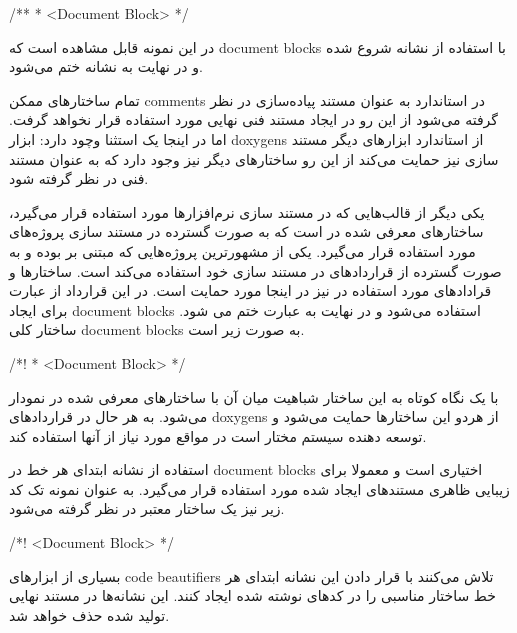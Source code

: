 \begin{C++}
/**
 * <Document Block>
 */
\end{C++}

در این نمونه قابل مشاهده است که \glspl{document block} با استفاده از نشانه
\lr{/**} شروع شده و در نهایت به نشانه \lr{*/} ختم می‌شود.

\begin{note}
تمام ساختارهای ممکن \glspl{comment} در استاندارد  به عنوان مستند
پیاده‌سازی در نظر گرفته می‌شود از این رو در ایجاد مستند فنی نهایی مورد استفاده
قرار نخواهد گرفت. اما در اینجا یک استثنا وچود دارد: ابزار \glspl{doxygen} از
استاندارد ابزارهای دیگر مستند سازی نیز حمایت می‌کند از این رو ساختارهای دیگر نیز
وجود دارد که به عنوان مستند فنی در نظر گرفته شود.
\end{note}


یکی دیگر از قالب‌هایی که در مستند سازی نرم‌افزارها مورد استفاده قرار می‌گیرد،
ساختارهای معرفی شده در  است که به صورت گسترده در مستند سازی پروژه‌های
 مورد استفاده قرار می‌گیرد. یکی از مشهورترین پروژه‌هایی که مبتنی بر
 بوده و به صورت گسترده از قراردادهای  در مستند سازی خود استفاده
می‌کند  است. ساختارها و قرادادهای مورد استفاده در  نیز در
اینجا مورد حمایت است. در این قرارداد از عبارت \lr{/*!} برای ایجاد
\glspl{document block} استفاده می‌شود و در نهایت به عبارت \lr{*/} ختم می شود.
ساختار کلی \glspl{document block} به صورت زیر است.

\begin{C++}
/*!
 * <Document Block>
 */
\end{C++}

با یک نگاه کوتاه به این ساختار شباهیت میان آ‌ن با ساختارهای
معرفی شده در  نمودار می‌شود. به هر حال در قراردادهای \glspl{doxygen}
از هردو این ساختارها حمایت می‌شود و توسعه دهنده سیستم مختار است در مواقع مورد
نیاز از آنها استفاده کند.

\begin{note}
استفاده از نشانه \lr{*} ابتدای هر خط در \glspl{document block} اختیاری است و
معمولا برای زیبایی ظاهری مستند‌های ایجاد شده مورد استفاده قرار می‌گیرد. به عنوان
نمونه تک کد زیر نیز یک ساختار معتبر در نظر گرفته می‌شود.

\begin{C++}
/*!
   <Document Block>
 */
\end{C++}

بسیاری از ابزارهای \glspl{code beautifier} تلاش می‌کنند با قرار دادن این نشانه
ابتدای هر خط ساختار مناسبی را در کدهای نوشته شده ایجاد کنند. این نشانه‌ها در
مستند نهایی تولید شده حذف خواهد شد.
\end{note}

